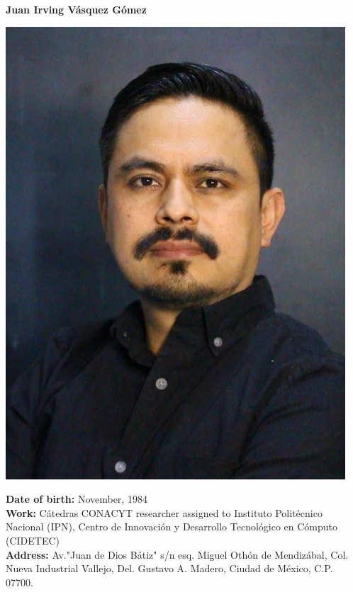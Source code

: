 \documentclass[10pt]{article}
\begin{document}
	
	\begin{center}
		{\bf {\LARGE Juan Irving Vásquez Gómez}}
		\vspace{0.5cm}
		
		\begin{minipage}[b]{0.30\linewidth}
			\centering
			\includegraphics[width=\textwidth]{jivg36}
		\end{minipage}
		\hspace{0.5cm}
		\begin{minipage}[b]{0.6\linewidth}
			\textbf{Date of birth:} November, 1984 \\
			\textbf{Work:} Cátedras CONACYT researcher assigned to Instituto Politécnico Nacional (IPN), 
			Centro de Innovación y Desarrollo Tecnológico en Cómputo (CIDETEC) \\ 
			\textbf{Address:} Av."Juan de Dios Bátiz" s/n esq. Miguel Othón de Mendizábal, 
			Col. Nueva Industrial Vallejo, Del. Gustavo A. Madero, Ciudad de México, C.P. 07700. \\

\end{minipage}
\end{center}
\end{document}
